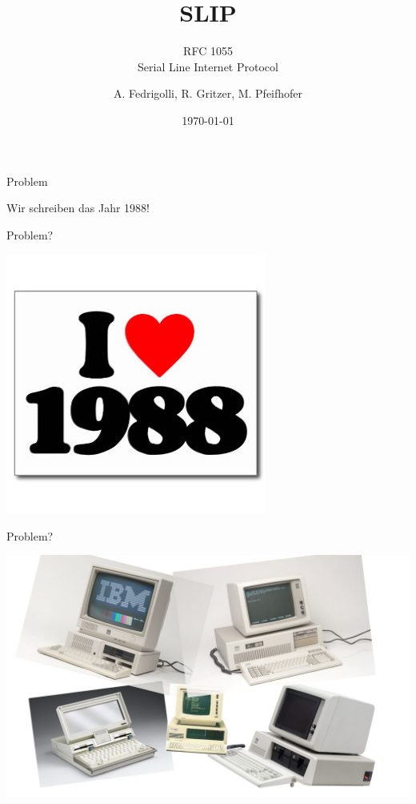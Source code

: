 \documentclass[beamer]{uibk}
\title{SLIP}
\subtitle{RFC 1055 \\ Serial Line Internet Protocol}
\author{A. Fedrigolli, R. Gritzer, M. Pfeifhofer }
\date{\today}
\begin{document}
\maketitle

\begin{frame}{Problem}
  \begin{center}
  Wir schreiben das Jahr {\huge 1988!}
  \end{center}
\end{frame}

\begin{frame}{Problem?}
  \begin{center}
  \includegraphics[width=\textwidth, height=\textheight ,keepaspectratio]{iheart.jpg}
  \end{center}
\end{frame}

\begin{frame}{Problem?}
  \begin{center}
  \includegraphics[width=\textwidth,height=\textheight,keepaspectratio]{1988computer.jpg}
  \end{center}
\end{frame}
\end{document}
